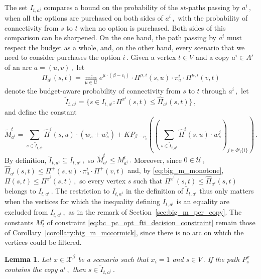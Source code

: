 \documentclass[11pt,a4paper]{report}
\newtheorem{lemma}[theorem]{Lemma}
\theoremstyle{definition}
\theoremstyle{remark}
\begin{document}
The set $I_{t,a^i}$ compares a bound on the probability of the $st$-paths passing by $a^i\,,$ when all the options are purchased on both sides of $a^i\,,$ with the probability of connectivity from $s$ to $t$ when no option is purchased. Both sides of this comparison can be sharpened. On the one hand, the path passing by $a^i$ must respect the budget as a whole, and, on the other hand, every scenario that we need to consider purchases the option $i\,.$ Given a vertex $t \in V$ and a copy $a^i \in A'$ of an arc $a = (u,v)\,,$ let
\begin{equation}
  \widehat{\Pi}_{a^i}(s,t) = \min_{\mu \in \mathcal{U}} e^{\mu \cdot (\beta - c_i)} \cdot \Pi^{\mu,i}(s,u) \cdot \pi^i_a \cdot \Pi^{\mu,i}(v,t)
\end{equation}
denote the budget-aware probability of connectivity from $s$ to $t$ through $a^i\,,$ let
\begin{equation}
  \tilde{I}_{t,a^i} = \{s \in I_{t,a^i} : \Pi^{x^i}(s,t) \leq \widehat{\Pi}_{a^i}(s,t)\}\,,
\end{equation}
and define the constant
\begin{equation}\label{eq:big_m_budget_filter}
  \tilde{M}^t_{a^i} = \sum_{s \in \tilde{I}_{t,a^i}} \widehat{\Pi}^i(s,u) \cdot \left(w_s + w^i_s\right) + KP_{\beta - c_i}\left(\left(\sum_{s \in \tilde{I}_{t,a^i}} \widehat{\Pi}^i(s,u) \cdot w^j_s\right)_{j \in \Phi \setminus \{i\}}\right)\,.
\end{equation}
By definition, $\tilde{I}_{t,a^i} \subseteq I_{t,a^i}\,,$ so $\tilde{M}^t_{a^i} \leq M^t_{a^i}\,.$ Moreover, since $0 \in \mathcal{U}\,,$ $\widehat{\Pi}_{a^i}(s,t) \leq \Pi^+(s,u) \cdot \pi^i_a \cdot \Pi^+(v,t)$ and, by \eqref{eq:big_m_monotone}, $\Pi(s,t) \leq \Pi^{x^i}(s,t)\,,$ so every vertex $s$ such that $\Pi^{x^i}(s,t) \leq \widehat{\Pi}_{a^i}(s,t)$ belongs to $I_{t,a^i}\,.$ The restriction to $I_{t,a^i}$ in the definition of $\tilde{I}_{t,a^i}$ thus only matters when the vertices for which the inequality defining $I_{t,a^i}$ is an equality are excluded from $I_{t,a^i}\,,$ as in the remark of Section~\ref{sec:big_m_per_copy}. The constants $M^i_t$ of constraint \eqref{eq:bc_pc_opt_fti_decision_constraint} remain those of Corollary~\ref{corollary:big_m_mccormick}, since there is no arc on which the vertices could be filtered.

\begin{lemma}\label{lemma:big_m_budget_filter}
  Let $x \in \mathcal{X}^\beta$ be a scenario such that $x_i = 1$ and $s \in V\,.$ If the path $P^x_s$ contains the copy $a^i\,,$ then $s \in \tilde{I}_{t,a^i}\,.$
\end{lemma}
\end{document}
